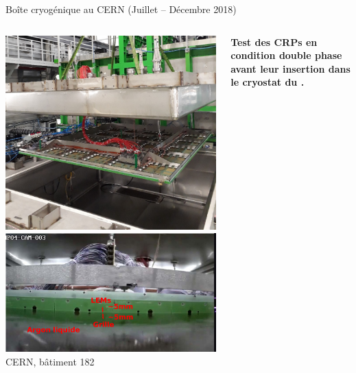     \begin{frame}{Boîte cryogénique au CERN (Juillet -- Décembre 2018)}
   		\begin{columns}
   			\begin{column}{0.4\textwidth}
   				\includegraphics[width=\textwidth]{./pictures/crp_inserting_coldbox.png}\\
   				\includegraphics[width=\textwidth]{./pictures/in_coldbox.png}\\
   				CERN, bâtiment 182
    		\end{column}
    		\begin{column}{0.6\textwidth}
    			\begin{scriptsize}
	    			\textbf{Test des CRPs en condition double phase avant leur insertion dans le cryostat du \SSS{}.}\\
	    			

\end{scriptsize}
\end{column}
\end{columns}
\end{frame}
